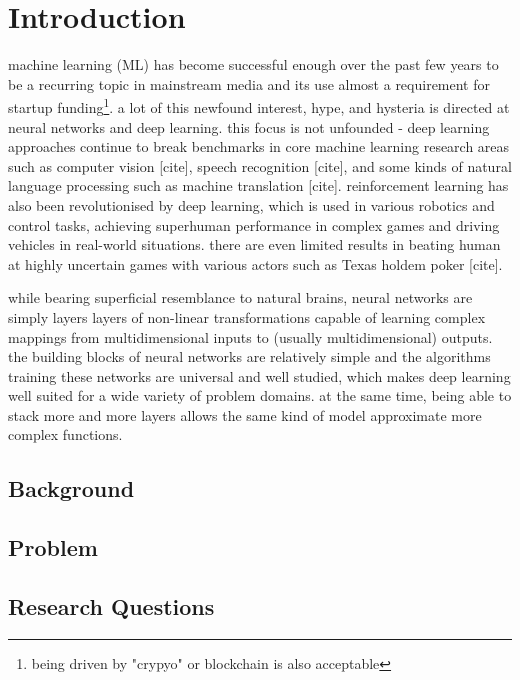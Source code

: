 \chapter{Introduction}


machine learning (ML) has become successful enough  over the past few years to be a recurring topic in mainstream media and its use almost a requirement for startup funding\footnote{being driven by "crypyo" or blockchain is also acceptable}.
a lot of this newfound interest, hype, and hysteria is directed at  neural networks and deep learning. this focus is not unfounded - deep learning approaches continue to break benchmarks in  core machine learning research areas such as computer vision [cite], speech recognition [cite], and  some kinds of natural language processing  such as machine translation [cite].
reinforcement learning has also been revolutionised by deep learning, which is used in various robotics and control tasks, achieving superhuman performance in complex games and driving vehicles in real-world situations.
there are even limited results in  beating human at highly uncertain games with various actors such as Texas holdem poker [cite].

while bearing superficial resemblance to  natural brains, neural networks are simply layers layers of non-linear transformations  capable of learning complex mappings from multidimensional inputs to (usually multidimensional) outputs.
the building blocks of neural networks are relatively simple and the algorithms  training these networks are universal and well studied, which makes deep learning  well suited for  a wide variety of problem domains.
at the same time, being able to stack more and more layers allows the same  kind of model  approximate more complex functions.


\section{Background}
\section{Problem}
\section{Research Questions}
